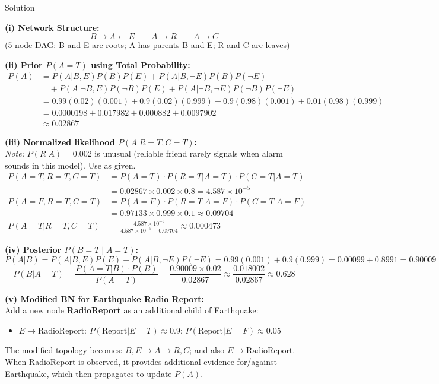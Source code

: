 \documentclass[12pt,a4paper]{article}
\begin{document}
\begin{solbox}{Solution}

\textbf{(i) Network Structure:}
\[
B \longrightarrow A \longleftarrow E \qquad A \longrightarrow R \qquad A \longrightarrow C
\]
(5-node DAG: B and E are roots; A has parents B and E; R and C are leaves)

\medskip
\textbf{(ii) Prior $P(A=T)$ using Total Probability:}
\begin{align*}
P(A) &= P(A|B,E)P(B)P(E) + P(A|B,\neg E)P(B)P(\neg E)\\
     &\quad + P(A|\neg B,E)P(\neg B)P(E) + P(A|\neg B,\neg E)P(\neg B)P(\neg E)\\[4pt]
     &= 0.99(0.02)(0.001) + 0.9(0.02)(0.999) + 0.9(0.98)(0.001) + 0.01(0.98)(0.999)\\
     &= 0.0000198 + 0.017982 + 0.000882 + 0.0097902\\
     &\approx \boxed{0.02867}
\end{align*}

\medskip
\textbf{(iii) Normalized likelihood $P(A|R=T, C=T)$:}\\
\textit{Note:} $P(R|A)=0.002$ is unusual (reliable friend rarely signals when alarm sounds in this model). Use as given.
\begin{align*}
P(A{=}T, R{=}T, C{=}T) &= P(A{=}T)\cdot P(R{=}T|A{=}T)\cdot P(C{=}T|A{=}T)\\
  &= 0.02867 \times 0.002 \times 0.8 = 4.587 \times 10^{-5}\\[4pt]
P(A{=}F, R{=}T, C{=}T) &= P(A{=}F)\cdot P(R{=}T|A{=}F)\cdot P(C{=}T|A{=}F)\\
  &= 0.97133 \times 0.999 \times 0.1 \approx 0.09704\\[4pt]
P(A{=}T|R{=}T,C{=}T) &= \frac{4.587\times10^{-5}}{4.587\times10^{-5} + 0.09704} \approx \boxed{0.000473}
\end{align*}

\medskip
\textbf{(iv) Posterior $P(B=T \mid A=T)$:}
\[
P(A|B) = P(A|B,E)P(E) + P(A|B,\neg E)P(\neg E) = 0.99(0.001) + 0.9(0.999) = 0.00099 + 0.8991 = 0.90009
\]
\[
P(B|A{=}T) = \frac{P(A{=}T|B)\cdot P(B)}{P(A{=}T)} = \frac{0.90009 \times 0.02}{0.02867} \approx \frac{0.018002}{0.02867} \approx \boxed{0.628}
\]

\medskip
\textbf{(v) Modified BN for Earthquake Radio Report:}\\
Add a new node \textbf{RadioReport} as an additional child of Earthquake:
\begin{itemize}[noitemsep]
  \item $E \to \text{RadioReport}$: $P(\text{Report}|E=T) \approx 0.9$; $P(\text{Report}|E=F) \approx 0.05$
\end{itemize}
The modified topology becomes: $B, E \to A \to R, C$; and also $E \to \text{RadioReport}$.\\
When RadioReport is observed, it provides additional evidence for/against Earthquake, which then propagates to update $P(A)$.
\end{solbox}
\end{document}
